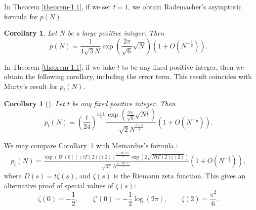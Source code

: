 \documentclass[10pt,a4paper]{amsart}
\newtheorem{corollary}[theorem]{Corollary}
\numberwithin{equation}{section}
\begin{document}
	In Theorem \ref{theorem-1.1}, if we set $t = 1$, we obtain Rademacher's asymptotic formula \cite{rademacher1938partition} for $p(N)$.
	\begin{corollary}\label{corollary-1.3}
		Let $N$ be a large positive integer. Then  
		\begin{equation*}
			p(N)=\frac{1}{4\sqrt{3}N}\exp\left(\frac{2\pi}{\sqrt{6}}\sqrt{N}\right)\left(1+O\left(N^{-\frac{1}{2}}\right)\right).
		\end{equation*}
	\end{corollary}
	In Theorem \ref{theorem-1.1}, if we take $t$ to be any fixed positive integer, then we obtain the following corollary, including the error term. This result coincides with Murty's result \cite{murty2013partition} for $p_t(N)$.
	\begin{corollary}[{\cite[Theorem 4]{murty2013partition}}]\label{corollary-1.4}
		Let $t$ be any fixed
		positive integer. Then
		\begin{equation*}
			p_{t}(N)=\left(\frac{t}{24}\right)^{\frac{t+1}{4}}\frac{\exp\left(\frac{2\pi}{\sqrt{6}}\sqrt{Nt}\right)}{\sqrt{2}N^{\frac{t+3}{4}}}\left(1+O\left(N^{-\frac{1}{2}}\right)\right).
		\end{equation*}  
	\end{corollary}
	We may compare Corollary~\ref{corollary-1.4} with Meinardus's formula \cite{meinardus1953}:
	\begin{align*}
		p_t(N)=\frac{\exp\left(D'(0)\right)\left(t\Gamma(2)\zeta(2)\right)^{\frac{1-2D(0)}{4}}\exp\left(2\sqrt{Nt\Gamma(2)\zeta(2)}\right)}{\sqrt{4\pi}\,N^{\frac{3-2D(0)}{4}}} \left(1+O\left(N^{-\frac{1}{2}}\right)\right), 
	\end{align*}
	where $D(s)=t\zeta(s)$, and $\zeta(s)$ is the Riemann zeta function. This gives an alternative proof of special values of $\zeta(s)$: 
	$$
	\zeta(0)=-\frac{1}{2}, \qquad
	\zeta'(0)=-\frac{1}{2}\log(2\pi), \qquad
	\zeta(2)=\frac{\pi^2}{6}.
	$$ 
	
\end{document}
